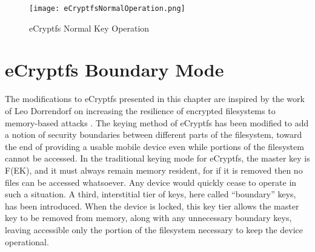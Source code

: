 \begin{figure}[htpb]
\begin{center}
\texttt{[image: eCryptfsNormalOperation.png]} \end{center}
\caption{eCryptfs Normal Key Operation} \label{fig:ecryptfsnormal} \end{figure}
\section{eCryptfs Boundary Mode}
\label{sec:boundarymode}

The modifications to eCryptfs presented in this chapter are inspired by the work of Leo Dorrendorf on increasing the resilience of
encrypted filesystems to memory-based attacks \cite{Dorrendorf2011}. The keying method of eCryptfs has been modified to add a
notion of security boundaries between different parts of the filesystem, toward the end of providing a usable mobile device even
while portions of the filesystem cannot be accessed. In the traditional keying mode for eCryptfs, the master key is
F(EK), and it must always remain memory resident, for if it is removed then no files can be accessed whatsoever.
Any device would quickly cease to operate in such a situation. A third, interstitial tier of keys, here called ``boundary'' keys, has
been introduced. When the device is locked, this key tier allows the master key to be removed from memory, along with any unnecessary
boundary keys, leaving accessible only the portion of the filesystem necessary to keep the device operational.

